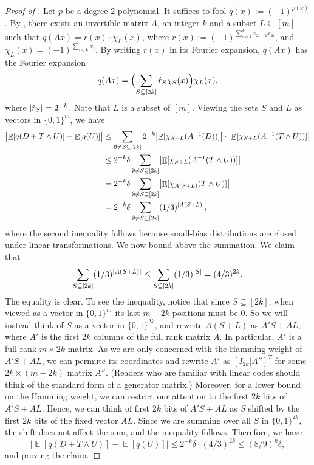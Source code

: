 \documentclass{toc}
\newcommand{\zo}{\{0,1\}}
\def\hr{\hat r}
\DeclarePairedDelimiter{\abs}{\lvert}{\rvert}
\DeclareMathOperator*{\E}{\mathbb{E}}                 %
\begin{document}
\begin{proof}[Proof of {}]
  Let $p$ be a degree-$2$ polynomial.
  It suffices to fool $q(x) := (-1)^{p(x)}$.
  By , there exists an invertible matrix $A$, an integer $k$ and a subset $L \subseteq [m]$ such that $q(Ax) = r(x) \cdot \chi_L(x)$,
  where $r(x) := (-1)^{\sum_{i=1}^k x_{2i-1} x_{2i}}$, and $\chi_L(x) = (-1)^{\sum_{i \in L} x_i}$.
  By writing $r(x)$ in its Fourier expansion, $q(Ax)$ has the Fourier expansion
  \[
    q(Ax) = \Bigl( \sum_{S \subseteq [2k]} \hr_S \chi_S(x) \Bigr) \chi_L(x), 
  \]
  where $\abs{\hr_S} = 2^{-k}$.
  Note that $L$ is a subset of $[m]$.
  Viewing the sets $S$ and $L$ as vectors in $\zo^m$, we have
  \begin{align*}
    \bigl| \E[q(D + T \wedge U)] - \E[q(U)] \bigr|
    &\le \sum_{\emptyset \neq S \subseteq [2k]} 2^{-k} \bigl| \E[\chi_{S + L}(A^{-1}(D))] \bigr| \cdot \bigl| \E[ \chi_{S + L}(A^{-1}(T \wedge U))] \bigr| \\
    &\le 2^{-k} \delta \sum_{\emptyset \neq S \subseteq [2k]} \bigl| \E[ \chi_{S + L}(A^{-1}(T \wedge U))] \bigr| \\
    &= 2^{-k} \delta \sum_{\emptyset \neq S \subseteq [2k]} \bigl| \E[ \chi_{A(S + L)}(T \wedge U)] \bigr| \\
    &= 2^{-k} \delta \sum_{\emptyset \neq S \subseteq [2k]} (1/3)^{\abs{A(S + L)}} ,
  \end{align*}
  where the second inequality follows because small-bias distributions are closed under linear transformations.
  We now bound above the summation.
  We claim that
  \[
    \sum_{S \subseteq [2k]} (1/3)^{\abs{A(S + L)}} \le \sum_{S \subseteq [2k]} (1/3)^{\abs{S}} = (4/3)^{2k} .
  \]
  The equality is clear.
  To see the inequality, notice that since $S \subseteq [2k]$, when viewed as a vector in $\zo^m$ its last $m-2k$ positions must be $0$.
  So we will instead think of $S$ as a vector in $\zo^{2k}$, and rewrite $A(S + L)$ as $A'S + AL$, where $A'$ is the first $2k$ columns of the full rank matrix $A$.
  In particular, $A'$ is a full rank $m \times 2k$ matrix.
  As we are only concerned with the Hamming weight of $A'S + AL$, we can permute its coordinates and rewrite $A'$ as $[I_{2k} | A'']^T$ for some $2k \times (m - 2k)$ matrix $A''$.
  (Readers who are familiar with linear codes should think of the standard form of a generator matrix.)
  Moreover, for a lower bound on the Hamming weight, we can restrict our attention to the first $2k$ bits of $A'S + AL$.
  Hence, we can think of first $2k$ bits of $A'S + AL$ as $S$ shifted by the first $2k$ bits of the fixed vector $AL$.
  Since we are summing over all $S$ in $\zo^{2k}$, the shift does not affect the sum, and the inequality follows.
  Therefore, we have
  \[
    \bigl| \E[q(D + T \wedge U)] - \E[q(U)] \bigr|
    \le 2^{-k} \delta \cdot (4/3)^{2k}
    \le (8/9)^k \delta,
  \]
  and proving the claim.
\end{proof}
\end{document}
